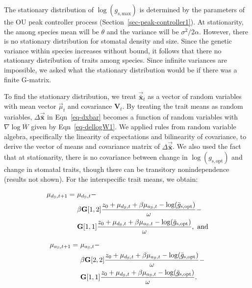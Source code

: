 \documentclass[
  letterpaper,
  DIV=11,
  numbers=noendperiod]{scrartcl}
\begin{document}
The stationary distribution of \(\log (g_\mathrm{s,max})\) is determined
by the parameters of the OU peak controller process
(Section~\ref{sec-peak-controller1}). At stationarity, the among species
mean will be \(\theta\) and the variance will be
\(\sigma ^ 2 / 2 \alpha\). However, there is no stationary distribution
for stomatal density and size. Since the genetic variance within species
increases without bound, it follows that there no stationary
distribution of traits among species. Since infinite variances are
impossible, we asked what the stationary distribution would be if there
was a finite \(\mathrm{G}\)-matrix.

To find the stationary distribution, we treat
\(\vec{\bar{\mathbf{x}}}_t\) as a vector of random variables with mean
vector \(\vec{\mu}_t\) and covariance \(\mathbf{V}_t\). By treating the
trait means as random variables, \(\Delta \vec{\bar{\mathbf{x}}}\) in
Eqn~\ref{eq-dxbar} becomes a function of random variables with
\(\nabla \log \overline{W}\) given by Eqn~\ref{eq-dellogW1}. We applied
rules from random variable algebra, specifically the linearity of
expectations and bilinearity of covariance, to derive the vector of
means and covariance matrix of \(\Delta \vec{\bar{\mathbf{x}}}\). We
also used the fact that at stationarity, there is no covariance between
change in \(\log (g_\mathrm{s,opt})\) and change in stomatal traits,
though there can be transitory nonindependence (results not shown). For
the interspecific trait means, we obtain:

\begin{align}
\label{eq:d1t1}
\mu_{d_{\mathrm{S}}, t + 1} =~& \mu_{d_{\mathrm{S}}, t} - \notag \\ 
  & \beta \mathbf{G}[1, 2] \frac{z_0 + \mu_{d_{\mathrm{S}}, t} + \beta \mu_{a_{\mathrm{S}}, t} - \log (\bar{g}_\mathrm{s,opt}) }{\omega} - \notag \\
  & \mathbf{G}[1, 1] \frac{z_0 + \mu_{d_{\mathrm{S}}, t} + \beta \mu_{a_{\mathrm{S}}, t} - \log (\bar{g}_\mathrm{s,opt})}{\omega},~\text{and}
\end{align}

\begin{align}
\label{eq:a1t1}
\mu_{a_{\mathrm{S}}, t + 1} =~& \mu_{a_{\mathrm{S}}, t} - \notag \\
  & \beta \mathbf{G}[2, 2] \frac{z_0 + \mu_{d_{\mathrm{S}}, t} + \beta \mu_{a_{\mathrm{S}}, t} - \log (\bar{g}_\mathrm{s,opt}) }{\omega} - \notag \\
  & \mathbf{G}[1, 1] \frac{z_0 + \mu_{d_{\mathrm{S}}, t} + \beta \mu_{a_{\mathrm{S}}, t} - \log (\bar{g}_\mathrm{s,opt}) }{\omega}.
\end{align}
\end{document}
